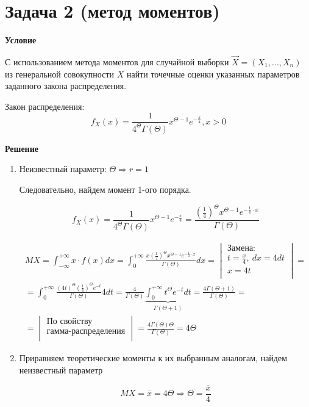 \documentclass[a4paper,14pt]{extreport} %
\begin{document}
\section{Задача 2 (метод моментов)}

\hfill

\textbf{Условие}

С использованием метода моментов для случайной выборки $\vec X = (X_1, . . . , X_n)$ из генеральной совокупности $X$ найти точечные оценки указанных параметров заданного закона распределения.

Закон распределения: $$f_X(x)=\frac{1}{4^{\Theta}\Gamma(\Theta)}x^{\Theta -1}e^{-\frac{x}{4}}, x>0$$

\hfill

\textbf{Решение}

\begin{enumerate}
\item 

Неизвестный параметр: $\Theta \Rightarrow r=1$

Следовательно, найдем момент 1-ого порядка. 

$$
f_X(x)=\frac{1}{4^{\Theta}\Gamma(\Theta)}x^{\Theta -1}e^{-\frac{x}{4}} = \frac{(\frac{1}{4})^\Theta x^{\Theta-1}e^{-\frac{1}{4}\cdot x}}{\Gamma(\Theta)}
$$

\begin{multline*}
MX = \int_{-\infty}^{+\infty}x\cdot f(x) dx=\int_0^{+\infty}\frac{x(\frac{1}{4})^\Theta x^{\Theta-1}e^{-\frac{1}{4}\cdot x}}{\Gamma(\Theta)}dx=
\begin{vmatrix}
\text{Замена:}\\
t=\frac{x}{4},~dx=4dt\\
x=4t\\
\end{vmatrix}
=\\
= \int_0^{+\infty} \frac{(4t)^\Theta (\frac{1}{4})^\Theta e^{-t}}{\Gamma(\Theta)}4 dt =\frac{4}{\Gamma(\Theta)}\underbrace{\int_0^{+\infty}t^\Theta e^{-t}dt}_{\Gamma(\Theta+1)}=\frac{4\Gamma(\Theta+1)}{\Gamma(\Theta)}=
\\ =\begin{vmatrix}
\text{По свойству}\\
\text{гамма-распределения}\\
\end{vmatrix}
= \frac{4\Gamma(\Theta)\Theta}{\Gamma(\Theta)}=4\Theta
\end{multline*}

\item Приравняем теоретические моменты к их выбранным аналогам, найдем неизвестный параметр

$$MX=\overline x=4\Theta \Rightarrow \Theta=\frac{\overline x}{4}$$

\end{enumerate}
\end{document}

